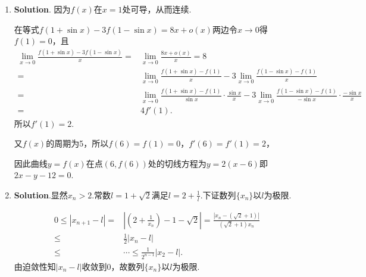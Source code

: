 \documentclass[../main.tex]{subfiles}
\begin{document}
\begin{enumerate}
          同时，$\frac{\xi}{x}$介于$1$与$\frac{\ln(1+x)}{x}$之间，显然$\lim_{x\to0}\frac{\xi}{x}
              =1$.故
          \[
              \begin{aligned}
                  \lim_{x\to0}\frac{f'(\xi)-f'(0)}{\xi-0}\cdot\frac{\xi}{x}\cdot\frac{x-\ln(1+x)}{x^2} & =f''(0)\cdot\frac{x-\left(x-\frac{x^2}{2}+o(x^2)\right)}{x^2} \\
                                                                                                       & =\frac{f''(0)}{2}.
              \end{aligned}
          \]

    \item \textbf{Solution}. 因为$f(x)$在$x=1$处可导，从而连续.

          在等式$f(1+\sin x)-3f(1-\sin x)=8x+o(x)$两边令$x\to0$得$f(1)=0$，且
          \[
              \begin{aligned}
                  \lim_{x\to0}\frac{f(1+\sin x)-3f(1-\sin x)}{x}= {} & \lim_{x\to0}\frac{8x+o(x)}{x}=8                                                                                                      \\
                  = {}                                               & \lim_{x\to0}\frac{f(1+\sin x)-f(1)}{x}-3\lim_{x\to0}\frac{f(1-\sin x)-f(1)}{x}                                                       \\
                  = {}                                               & \lim_{x\to0}\frac{f(1+\sin x)-f(1)}{\sin x}\cdot\frac{\sin x}{x}-3\lim_{x\to0}\frac{f(1-\sin x)-f(1)}{-\sin x}\cdot\frac{-\sin x}{x} \\
                  = {}                                               & 4f'(1).
              \end{aligned}
          \]
          所以$f'(1)=2$.

          又$f(x)$的周期为5，所以$f(6)=f(1)=0$，$f'(6)=f'(1)=2$，

          因此曲线$y=f(x)$在点$(6,f(6))$处的切线方程为$y=2(x-6)$即$2x-y-12=0$.

    \item \textbf{Solution}.显然$x_{n}>2$.常数$l=1+\sqrt{2}$满足$l=2+\frac{1}{l}$.下证数列$\{
              x_{n}\}$以$l$为极限.

          \[
              \begin{aligned}
                  0\leq|x_{n+1}-l|= {} & \left|\left(2+\frac{1}{x_n}\right)-1-\sqrt{2}\right|=\frac{\left|x_n-\left(\sqrt{2}+1\right)\right|}{\left(\sqrt{2}+1\right)x_n} \\
                  \leq {}              & \frac{1}{2}|x_{n}-l|                                                                                                             \\
                  \leq {}              & \cdots \leq \frac{1}{2^{n-1}}|x_{2}-l|.
              \end{aligned}
          \]
          由迫敛性知$|x_{n}-l|$收敛到$0$，故数列$\{x_{n}\}$以$l$为极限.
\end{enumerate}
\end{document}
